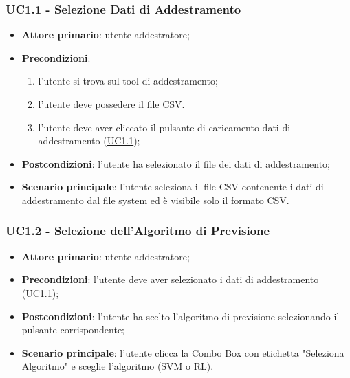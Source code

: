 		\subsubsection{UC1.1 - Selezione Dati di Addestramento }
		\begin{itemize}
			\item\textbf{Attore primario}: utente addestratore;
			\item\textbf{Precondizioni}:
				\begin{enumerate}
					\item l’utente si trova sul tool di addestramento;
					\item l’utente deve possedere il file CSV.
					\item  l’utente deve aver cliccato il pulsante di caricamento dati di addestramento (\hyperref[par:UC1.1]{UC1.1});
				\end{enumerate}
			\item\textbf{Postcondizioni}: l’utente ha selezionato il file dei dati di addestramento;
			\item\textbf{Scenario principale}: l’utente seleziona il file CSV contenente i dati di addestramento dal file system ed è visibile solo il formato CSV.
		\end{itemize}
		
		\label{par:UC1.2}
		\subsubsection{UC1.2 - Selezione dell’Algoritmo di Previsione}
		\begin{itemize}
			\item\textbf{Attore primario}: utente addestratore;
			\item\textbf{Precondizioni}: l’utente deve aver selezionato i dati di addestramento (\hyperref[par:UC1.1]{UC1.1}); 
			\item\textbf{Postcondizioni}: l’utente ha scelto l’algoritmo di previsione selezionando il pulsante corrispondente;
			\item\textbf{Scenario principale}: l’utente clicca la Combo Box con etichetta "Seleziona Algoritmo" e sceglie l’algoritmo (SVM o RL).
		\end{itemize}
	
	\label{par:UC1.3}
